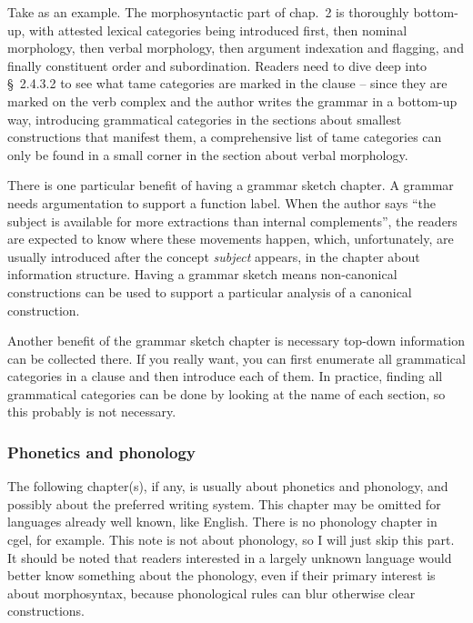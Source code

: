 \documentclass[UTF8, a4paper, oneside, scheme=plain]{ctexart}
\newcommand*{\citesec}[1]{\S~{#1}}
\newcommand*{\citechap}[1]{chap.~{#1}}
\newcommand*{\term}[1]{\emph{#1}}
\begin{document}
Take \citet{jacques2021grammar} as an example.
The morphosyntactic part of \citechap{2} is thoroughly bottom-up,
with attested lexical categories being introduced first,
then nominal morphology,
then verbal morphology,
then argument indexation and flagging,
and finally constituent order and subordination.
Readers need to dive deep into \citesec{2.4.3.2} to see what \ac{tame} categories are marked in the clause
-- since they are marked on the verb complex 
and the author writes the grammar in a bottom-up way,
introducing grammatical categories in the sections about smallest constructions 
that manifest them,
a comprehensive list of \ac{tame} categories can only be found 
in a small corner in the section about verbal morphology.

There is one particular benefit of having a grammar sketch chapter.
A grammar needs argumentation to support a function label.
When the author says ``the subject is available for more extractions than internal complements'',
the readers are expected to know where these movements happen,
which, unfortunately,
are usually introduced after the concept \term{subject} appears,
in the chapter about information structure.
Having a grammar sketch means non-canonical constructions 
can be used to support a particular analysis of a canonical construction.

Another benefit of the grammar sketch chapter is necessary top-down information can be collected there.
If you really want, you can first enumerate all grammatical categories in a clause 
and then introduce each of them.
In practice,
finding all grammatical categories can be done by looking at the name of each section,
so this probably is not necessary.

\subsubsection{Phonetics and phonology}

The following chapter(s), if any, is usually about phonetics and phonology,
and possibly about the preferred writing system.
This chapter may be omitted for languages already well known, like English.
There is no phonology chapter in \ac{cgel}, for example.
This note is not about phonology, so I will just skip this part.
It should be noted that readers interested in a largely unknown language 
would better know something about the phonology,
even if their primary interest is about morphosyntax,
because phonological rules can blur otherwise clear constructions.
\end{document}
